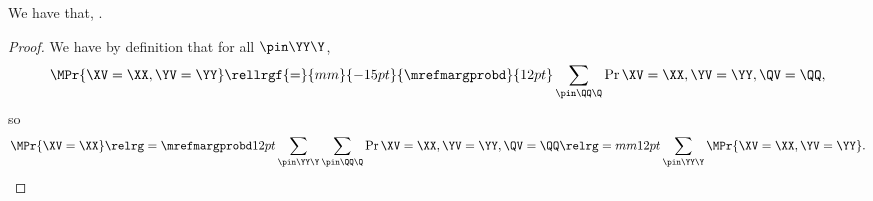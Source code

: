 \begin{proposition}
  We have that, \mprobgprop.%
\end{proposition}

\begin{proof}
  We have by definition that for all $\pin\YY\Y$,
  $$\MPr{\XV = \XX, \YV = \YY} \rellrgf{=}{mm}{-15pt}{\mrefmargprobd}{12pt} \sum_{\pin\QQ\Q}\Pr{\XV = \XX, \YV = \YY, \QV = \QQ},$$
  so
  $$\MPr{\XV = \XX} \relrg = {\mrefmargprobd} 12pt \sum_{\pin\YY\Y}\sum_{\pin\QQ\Q}\Pr{\XV = \XX, \YV = \YY, \QV = \QQ} \relrg = mm 12pt
  \sum_{\pin\YY\Y}\MPr{\XV = \XX, \YV = \YY}.$$%
\end{proof}
